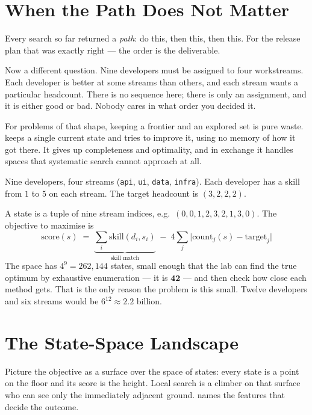\section{When the Path Does Not Matter}

Every search so far returned a \emph{path}: do this, then this, then this. For the
release plan that was exactly right --- the order is the deliverable.

Now a different question. Nine developers must be assigned to four workstreams.
Each developer is better at some streams than others, and each stream wants a
particular headcount. There is no sequence here; there is only an assignment, and it
is either good or bad. Nobody cares in what order you decided it.

For problems of that shape, keeping a frontier and an explored set is pure waste.
 keeps a single current state and tries to improve it, using no
memory of how it got there. It gives up completeness and optimality, and in exchange
it handles spaces that systematic search cannot approach at all.

\begin{examplebox}
Nine developers, four streams (\texttt{api}, \texttt{ui}, \texttt{data},
\texttt{infra}). Each developer has a skill from $1$ to $5$ on each stream. The
target headcount is $(3,2,2,2)$.

A state is a tuple of nine stream indices, e.g.\ $(0,0,1,2,3,2,1,3,0)$. The
objective to maximise is
\[
  \mathrm{score}(s) \;=\;
  \underbrace{\sum_{i} \mathrm{skill}(d_{i}, s_{i})}_{\text{skill match}}
  \;-\;
  4 \sum_{j} \bigl| \mathrm{count}_{j}(s) - \mathrm{target}_{j} \bigr|
\]
The space has $4^{9} = 262{,}144$ states, small enough that the lab can find the
true optimum by exhaustive enumeration --- it is $\mathbf{42}$ --- and then check
how close each method gets. That is the only reason the problem is this small.
Twelve developers and six streams would be $6^{12} \approx 2.2$ billion.
\end{examplebox}

\section{The State-Space Landscape}

Picture the objective as a surface over the space of states: every state is a point
on the floor and its score is the height. Local search is a climber on that surface
who can see only the immediately adjacent ground.  names the
features that decide the outcome.


